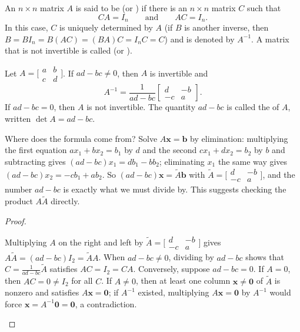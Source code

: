 \documentclass[10pt]{scrartcl}
\newcommand{\vv}[1]{\mathbf{#1}}
\begin{document}
\begin{definition*}
  An $n\times n$ matrix $A$ is said to be  (or ) if there is an $n\times n$ matrix $C$ such that
  \[
    CA = I_n \qquad\text{and}\qquad AC = I_n.
  \]
  In this case, $C$ is uniquely determined by $A$ (if $B$ is another inverse, then $B=BI_n=B(AC)=(BA)C=I_nC=C$) and is denoted by $A^{-1}$. A matrix that is not invertible is called  (or ).
\end{definition*}

\begin{theorem*}
  Let $A=\bigl[\begin{smallmatrix}a&b\\c&d\end{smallmatrix}\bigr]$. If $ad-bc\ne 0$, then $A$ is invertible and
  \[
    A^{-1} = \frac{1}{ad-bc}\begin{bmatrix} d & -b \\ -c & a \end{bmatrix}.
  \]
  If $ad-bc=0$, then $A$ is not invertible. The quantity $ad-bc$ is called the  of $A$, written $\det A=ad-bc$.
\end{theorem*}
\begin{ideabox}
  Where does the formula come from? Solve $A\vv x=\vv b$ by elimination: multiplying the first equation $ax_1+bx_2=b_1$ by $d$ and the second $cx_1+dx_2=b_2$ by $b$ and subtracting gives $(ad-bc)x_1=db_1-bb_2$; eliminating $x_1$ the same way gives $(ad-bc)x_2=-cb_1+ab_2$. So $(ad-bc)\vv x=\widetilde A\vv b$ with $\widetilde A=\bigl[\begin{smallmatrix}d&-b\\-c&a\end{smallmatrix}\bigr]$, and the number $ad-bc$ is exactly what we must divide by. This suggests checking the product $A\widetilde A$ directly.
\end{ideabox}
\begin{proof}
  \begin{steps}
    \ii Multiplying $A$ on the right and left by $\widetilde A=\bigl[\begin{smallmatrix}d&-b\\-c&a\end{smallmatrix}\bigr]$ gives $A\widetilde A=(ad-bc)I_2=\widetilde AA$. When $ad-bc\ne 0$, dividing by $ad-bc$ shows that $C=\frac{1}{ad-bc}\widetilde A$ satisfies $AC=I_2=CA$.
    \ii Conversely, suppose $ad-bc=0$. If $A=0$, then $AC=0\ne I_2$ for all $C$. If $A\ne 0$, then at least one column $\vv x\ne\vv 0$ of $\widetilde A$ is nonzero and satisfies $A\vv x=\vv 0$; if $A^{-1}$ existed, multiplying $A\vv x=\vv 0$ by $A^{-1}$ would force $\vv x=A^{-1}\vv 0=\vv 0$, a contradiction.
  \end{steps}
\end{proof}
\end{document}
